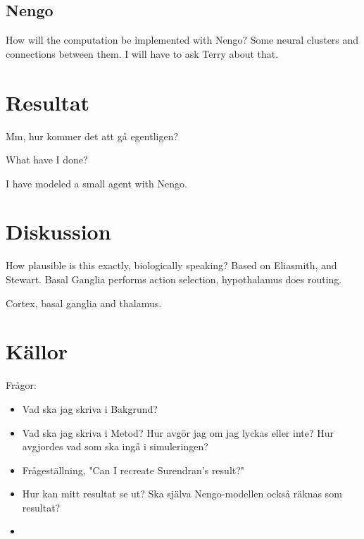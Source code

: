 \documentclass[12pt]{article}
\begin{document}
\subsection{Nengo}
How will the computation be implemented with Nengo? Some neural clusters and connections between them. 
I will have to ask Terry about that. 


\section{Resultat}
Mm, hur kommer det att gå egentligen?

What have I done?

I have modeled a small agent with Nengo.


\section{Diskussion}


How plausible is this exactly, biologically speaking? 
Based on Eliasmith, and Stewart.  
Basal Ganglia performs action selection, hypothalamus does routing. 

Cortex, basal ganglia and thalamus. 

%

\section{Källor}




Frågor: 

\begin{itemize}
\item Vad ska jag skriva i Bakgrund?
\item Vad ska jag skriva i Metod? Hur avgör jag om jag lyckas eller inte? Hur avgjordes vad som ska ingå i simuleringen?
\item Frågeställning, "Can I recreate Surendran's result?"
\item Hur kan mitt resultat se ut? Ska själva Nengo-modellen också räknas som resultat?
\item 
\end{itemize} 

{}

\end{document}
